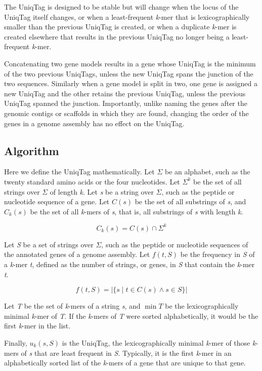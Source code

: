 \documentclass{bioinfo}
\begin{document}
The UniqTag is designed to be stable but will change when the locus of
the UniqTag itself changes, or when a least-frequent \emph{k}-mer that
is lexicographically smaller than the previous UniqTag is created, or
when a duplicate \emph{k}-mer is created elsewhere that results in the
previous UniqTag no longer being a least-frequent \emph{k}-mer.

Concatenating two gene models results in a gene whose UniqTag is the
minimum of the two previous UniqTags, unless the new UniqTag spans the
junction of the two sequences. Similarly when a gene model is split in
two, one gene is assigned a new UniqTag and the other retains the
previous UniqTag, unless the previous UniqTag spanned the junction.
Importantly, unlike naming the genes after the genomic contigs or
scaffolds in which they are found, changing the order of the genes in a
genome assembly has no effect on the UniqTag.

\subsection*{Algorithm}\label{algorithm}

Here we define the UniqTag mathematically. Let $\Sigma$ be an alphabet,
such as the twenty standard amino acids or the four nucleotides. Let
$\Sigma^k$ be the set of all strings over $\Sigma$ of length \emph{k}.
Let \emph{s} be a string over $\Sigma$, such as the peptide or
nucleotide sequence of a gene. Let $C(s)$ be the set of all substrings
of \emph{s}, and $C_k(s)$ be the set of all \emph{k}-mers of \emph{s},
that is, all substrings of \emph{s} with length \emph{k}.

\[
C_k(s) = C(s) \cap \Sigma^k
\]

Let \emph{S} be a set of strings over $\Sigma$, such as the peptide or
nucleotide sequences of the annotated genes of a genome assembly. Let
$f(t, S)$ be the frequency in \emph{S} of a \emph{k}-mer \emph{t},
defined as the number of strings, or genes, in \emph{S} that contain the
\emph{k}-mer \emph{t}.

\[
f(t, S) = \left\vert \{ s \mid t \in C(s) \wedge s \in S \} \right\vert
\]

Let \emph{T} be the set of \emph{k}-mers of a string \emph{s}, and
$\min T$ be the lexicographically minimal \emph{k}-mer of \emph{T}. If
the \emph{k}-mers of \emph{T} were sorted alphabetically, it would be
the first \emph{k}-mer in the list.

Finally, $u_k(s, S)$ is the UniqTag, the lexicographically minimal
\emph{k}-mer of those \emph{k}-mers of \emph{s} that are least frequent
in \emph{S}. Typically, it is the first \emph{k}-mer in an
alphabetically sorted list of the \emph{k}-mers of a gene that are
unique to that gene.
\end{document}
